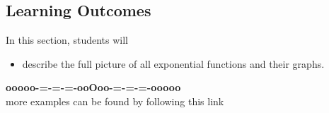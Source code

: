 \documentclass{ximera}
\begin{document}
\subsection*{Learning Outcomes}


\begin{sectionOutcomes}
In this section, students will 

\begin{itemize}
\item describe the full picture of all exponential functions and their graphs.
\end{itemize}
\end{sectionOutcomes}












\begin{center}
\textbf{\textcolor{green!50!black}{ooooo-=-=-=-ooOoo-=-=-=-ooooo}} \\

more examples can be found by following this link\\ 

\end{center}
\end{document}
